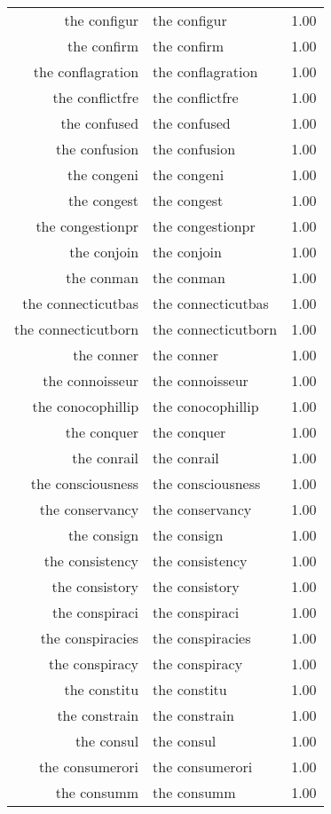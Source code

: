 \begin{table}[ht]
\begin{tabular}{rlr}
  the configur & the configur & 1.00 \\ 
  the confirm & the confirm & 1.00 \\ 
  the conflagration & the conflagration & 1.00 \\ 
  the conflictfre & the conflictfre & 1.00 \\ 
  the confused & the confused & 1.00 \\ 
  the confusion & the confusion & 1.00 \\ 
  the congeni & the congeni & 1.00 \\ 
  the congest & the congest & 1.00 \\ 
  the congestionpr & the congestionpr & 1.00 \\ 
  the conjoin & the conjoin & 1.00 \\ 
  the conman & the conman & 1.00 \\ 
  the connecticutbas & the connecticutbas & 1.00 \\ 
  the connecticutborn & the connecticutborn & 1.00 \\ 
  the conner & the conner & 1.00 \\ 
  the connoisseur & the connoisseur & 1.00 \\ 
  the conocophillip & the conocophillip & 1.00 \\ 
  the conquer & the conquer & 1.00 \\ 
  the conrail & the conrail & 1.00 \\ 
  the consciousness & the consciousness & 1.00 \\ 
  the conservancy & the conservancy & 1.00 \\ 
  the consign & the consign & 1.00 \\ 
  the consistency & the consistency & 1.00 \\ 
  the consistory & the consistory & 1.00 \\ 
  the conspiraci & the conspiraci & 1.00 \\ 
  the conspiracies & the conspiracies & 1.00 \\ 
  the conspiracy & the conspiracy & 1.00 \\ 
  the constitu & the constitu & 1.00 \\ 
  the constrain & the constrain & 1.00 \\ 
  the consul & the consul & 1.00 \\ 
  the consumerori & the consumerori & 1.00 \\ 
  the consumm & the consumm & 1.00 \\ 

\end{tabular}
\end{table}
